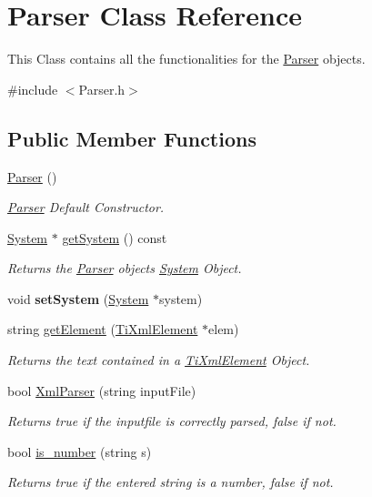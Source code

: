 \hypertarget{classParser}{}\section{Parser Class Reference}
\label{classParser}


This Class contains all the functionalities for the \hyperlink{classParser}{Parser} objects.  




{\ttfamily \#include $<$Parser.\+h$>$}

\subsection*{Public Member Functions}
\begin{DoxyCompactItemize}
\item 
\hyperlink{classParser_a12234f6cd36b61af4b50c94a179422c1}{Parser} ()\hypertarget{classParser_a12234f6cd36b61af4b50c94a179422c1}{}\label{classParser_a12234f6cd36b61af4b50c94a179422c1}

\begin{DoxyCompactList}\small\item\em \hyperlink{classParser}{Parser} Default Constructor. \end{DoxyCompactList}\item 
\hyperlink{classSystem}{System} $\ast$ \hyperlink{classParser_addad80574e43b744a82807d0f821d414}{get\+System} () const 
\begin{DoxyCompactList}\small\item\em Returns the \hyperlink{classParser}{Parser} object\textquotesingle{}s \hyperlink{classSystem}{System} Object. \end{DoxyCompactList}\item 
void {\bfseries set\+System} (\hyperlink{classSystem}{System} $\ast$system)\hypertarget{classParser_aaf58c6aafde4e7b889fbaa5d1f3aa6fe}{}\label{classParser_aaf58c6aafde4e7b889fbaa5d1f3aa6fe}

\item 
string \hyperlink{classParser_a36b746dbf631544851e0af2d0e7c6982}{get\+Element} (\hyperlink{classTiXmlElement}{Ti\+Xml\+Element} $\ast$elem)
\begin{DoxyCompactList}\small\item\em Returns the text contained in a \hyperlink{classTiXmlElement}{Ti\+Xml\+Element} Object. \end{DoxyCompactList}\item 
bool \hyperlink{classParser_aa8cdba8032e5d5d87b249be597b196c7}{Xml\+Parser} (string input\+File)
\begin{DoxyCompactList}\small\item\em Returns true if the inputfile is correctly parsed, false if not. \end{DoxyCompactList}\item 
bool \hyperlink{classParser_a8f97eab6905436595f33dc82b8957bbd}{is\+\_\+number} (string s)
\begin{DoxyCompactList}\small\item\em Returns true if the entered string is a number, false if not. \end{DoxyCompactList}\end{DoxyCompactItemize}


